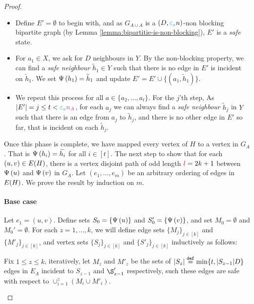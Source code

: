 \documentclass[11pt]{article}
\newcommand{\epsilonA}{\textcolor{ballblue}{\epsilon_a}}
\newcommand{\na}{\textcolor{razzmatazz}{n_A}}
\newcommand{\BipartiteG}{G_{A \cup A}}
\begin{document}
\begin{proof}
\begin{itemize}
	\item Define $E' = \emptyset$ to begin with, and as $\BipartiteG$ is a $(D, \epsilonA n)$-non blocking bipartite graph (by Lemma \ref{lemma:bipartitie-is-non-blocking}), $E'$ is a \emph{safe} state.
	\item For $a_1 \in X$, we ask for $D$ neighbours in $Y$. By the non-blocking property, we can find a \emph{safe neighbour} $\tilde{h}_1 \in Y$ such that there is no edge in $E'$ is incident on $\tilde{h}_1$. We set $\Psi\left(h_1\right) = \widetilde{h}_1$ and update $E' = E'  \cup \{(a_1, \tilde{h}_1)\}$.
	\item We repeat this process for all $a \in \{a_2, \dots, a_t\}$. For the $j$'th step, As $|E'| = j \leq t < \epsilonA\na$, for each $a_j$ we can always find a \emph{safe neighbour} $\tilde{h}_j$ in $Y$ such that there is an edge from $a_j$ to $\tilde{h}_j$, and there is no other edge in $E'$ so far, that is incident on each $\tilde{h}_j$.
\end{itemize}

Once this phase is complete, we have mapped every vertex of $H$ to a vertex in $G_A$.
That is $\Psi\left(h_i\right) = \widetilde{h_i}$ for all $i \in [t]$.
The next step to show that for each $(u,v) \in E(H)$, there is a vertex disjoint path of odd length $\textcolor{red}{l} = 2k+1$ between $\Psi\left(u\right)$ and $\Psi\left(v\right)$ in $G_A$.
Let $(e_1, \dots, e_m)$ be an arbitrary ordering of edges in $E(H)$.
We prove the result by induction on $m$.

\paragraph{Base case} 

Let $e_1 = (u,v)$. Define sets $S_0 = \{\Psi\left(u\right)\}$ and $S'_0 = \{ \Psi\left(v\right)\}$, and set $M_0 = \emptyset$ and $M_0' = \emptyset$.
For each $z=1, \dots, k$, we will define edge sets $\{ M_j\}_{j \in [k]}$ and $ \{ M'_j\}_{j \in [k]}$, and vertex sets $\{ S_j\}_{j \in [k]}$ and $\{ S'_j\}_{j \in [k]}$ inductively as follows:

\begin{tcolorbox}
Fix $ 1 \leq z \leq k$, iteratively, let $M_z$ and $M'_z$ be the sets of $|S_z| \text{}\overset{\mathtt{def}}{=} \min\{t, |S_{z-1}|D\}$ edges in $E_A$ incident to $S_{z-1}$ and $\S_{z-1}'$ respectively, such these edges are safe with respect to $\cup_{i=1}^{z} (M_i \cup M'_i)$.\\



\end{tcolorbox}
\end{proof}
\end{document}
